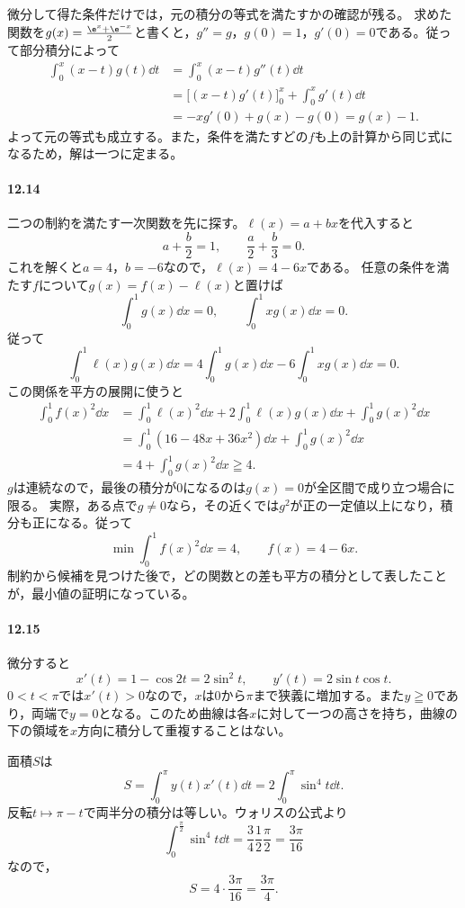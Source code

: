 微分して得た条件だけでは，元の積分の等式を満たすかの確認が残る。
求めた関数を$g(x)=\frac{\e^x+\e^{-x}}2$と書くと，$g''=g$，$g(0)=1$，$g'(0)=0$である。従って部分積分によって
\[
 \begin{aligned}
 \int_0^x(x-t)g(t)\dd t
 &=\int_0^x(x-t)g''(t)\dd t\\
 &=\bigl[(x-t)g'(t)\bigr]_0^x+\int_0^xg'(t)\dd t\\
 &=-xg'(0)+g(x)-g(0)=g(x)-1.
 \end{aligned}
\]
よって元の等式も成立する。また，条件を満たすどの$f$も上の計算から同じ式になるため，解は一つに定まる。

\paragraph{12.14}
二つの制約を満たす一次関数を先に探す。$\ell(x)=a+bx$を代入すると
\[
 a+\frac b2=1,\qquad \frac a2+\frac b3=0.
\]
これを解くと$a=4$，$b=-6$なので，$\ell(x)=4-6x$である。
任意の条件を満たす$f$について$g(x)=f(x)-\ell(x)$と置けば
\[
 \int_0^1g(x)\dd x=0,\qquad
 \int_0^1xg(x)\dd x=0.
\]
従って
\[
 \int_0^1\ell(x)g(x)\dd x
 =4\int_0^1g(x)\dd x-6\int_0^1xg(x)\dd x=0.
\]
この関係を平方の展開に使うと
\[
 \begin{aligned}
 \int_0^1f(x)^2\dd x
 &=\int_0^1\ell(x)^2\dd x
   +2\int_0^1\ell(x)g(x)\dd x+\int_0^1g(x)^2\dd x\\
 &=\int_0^1(16-48x+36x^2)\dd x+\int_0^1g(x)^2\dd x\\
 &=4+\int_0^1g(x)^2\dd x\geqq4.
 \end{aligned}
\]
$g$は連続なので，最後の積分が$0$になるのは$g(x)=0$が全区間で成り立つ場合に限る。
実際，ある点で$g\ne0$なら，その近くでは$g^2$が正の一定値以上になり，積分も正になる。従って
\[
 \boxed{\min\int_0^1f(x)^2\dd x=4,\qquad f(x)=4-6x}.
\]
制約から候補を見つけた後で，どの関数との差も平方の積分として表したことが，最小値の証明になっている。

\paragraph{12.15}
微分すると
\[
 x'(t)=1-\cos2t=2\sin^2t,\qquad
 y'(t)=2\sin t\cos t.
\]
$0<t<\pi$では$x'(t)>0$なので，$x$は$0$から$\pi$まで狭義に増加する。また$y\geqq0$であり，両端で$y=0$となる。このため曲線は各$x$に対して一つの高さを持ち，曲線の下の領域を$x$方向に積分して重複することはない。

面積$S$は
\[
 S=\int_0^\pi y(t)x'(t)\dd t
 =2\int_0^\pi\sin^4t\dd t.
\]
反転$t\mapsto\pi-t$で両半分の積分は等しい。ウォリスの公式より
\[
 \int_0^{\frac\pi2}\sin^4t\dd t
 =\frac34\frac12\frac\pi2=\frac{3\pi}{16}
\]
なので，
\[
 \boxed{S=4\cdot\frac{3\pi}{16}=\frac{3\pi}{4}}.
\]

